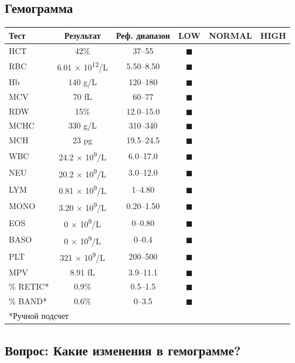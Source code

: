 \documentclass[a4paper,12pt]{book}
\begin{document}
\subsection*{Гемограмма}
\begin{tabular}{lccccc}
\toprule
Тест & Результат & Реф. диапазон & LOW & NORMAL & HIGH \\
\midrule
HCT & 42\% & 37--55 & $\blacksquare$ \\
RBC & 6.01 × 10\textsuperscript{12}/L & 5.50--8.50 & $\blacksquare$ \\
Hb & 140 g/L & 120--180 & $\blacksquare$ \\
MCV & 70 fL & 60--77 & $\blacksquare$ \\
RDW & 15\% & 12.0--15.0 & $\blacksquare$ \\
MCHC & 330 g/L & 310--340 & $\blacksquare$ \\
MCH & 23 pg & 19.5--24.5 & $\blacksquare$ \\
WBC & 24.2 × 10\textsuperscript{9}/L & 6.0--17.0 & $\blacksquare$ \\
NEU & 20.2 × 10\textsuperscript{9}/L & 3.0--12.0 & $\blacksquare$ \\
LYM & 0.81 × 10\textsuperscript{9}/L & 1--4.80 & $\blacksquare$ \\
MONO & 3.20 × 10\textsuperscript{9}/L & 0.20--1.50 & $\blacksquare$ \\
EOS & 0 × 10\textsuperscript{9}/L & 0--0.80 & $\blacksquare$ \\
BASO & 0 × 10\textsuperscript{9}/L & 0--0.4 & $\blacksquare$ \\
PLT & 321 × 10\textsuperscript{9}/L & 200--500 & $\blacksquare$ \\
MPV & 8.91 fL & 3.9--11.1 & $\blacksquare$ \\
\% RETIC* & 0.9\% & 0.5--1.5 & $\blacksquare$ \\
\% BAND* & 0.6\% & 0--3.5 & $\blacksquare$ \\
\bottomrule
\multicolumn{6}{l}{*Ручной подсчет}
\end{tabular}

\subsection*{Вопрос: Какие изменения в гемограмме?}
\end{document}
